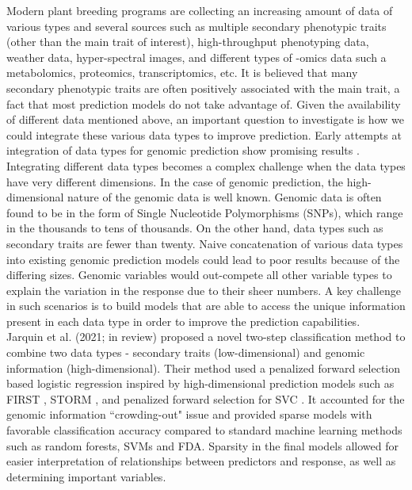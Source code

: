 Modern plant breeding programs are collecting an increasing amount of data of various types and several sources such as multiple secondary phenotypic traits (other than the main trait of interest), high-throughput phenotyping data, weather data, hyper-spectral images, and different types of -omics data such a metabolomics, proteomics, transcriptomics, etc. It is believed that many secondary phenotypic traits are often positively associated with the main trait, a fact that most prediction models do not take advantage of. Given the availability of different data mentioned above, an important question to investigate is how we could integrate these various data types to improve prediction. Early attempts at integration of data types for genomic prediction show promising results \cite{schrag_beyond_2018 , lopez-cruz_regularized_2020, arouisse_improving_2021, sandhu_combining_2021}. \\

Integrating different data types becomes a complex challenge when the data types have very different dimensions. In the case of genomic prediction, the high-dimensional nature of the genomic data is well known. Genomic data is often found to be in the form of Single Nucleotide Polymorphisms (SNPs), which range in the thousands to tens of thousands. On the other hand, data types such as secondary traits are fewer than twenty. Naive concatenation of various data types into existing genomic prediction models could lead to poor results because of the differing sizes. Genomic variables would out-compete all other variable types to explain the variation in the response due to their sheer numbers. A key challenge in such scenarios is to build models that are able to access the unique information present in each data type in order to improve the prediction capabilities. \\

Jarquin et al. (2021; in review) proposed a novel two-step classification method to combine two data types - secondary traits (low-dimensional) and genomic information (high-dimensional). Their method used a penalized forward selection based logistic regression inspired by high-dimensional prediction models such as FIRST \cite{ghosal_first_2009}, STORM \cite{turnbull_iterative_2013}, and penalized forward selection for SVC \cite{ghosal_sparse_2016}. It accounted for the genomic information ``crowding-out" issue and provided sparse models with favorable classification accuracy compared to standard machine learning methods such as random forests, SVMs and FDA. Sparsity in the final models allowed for easier interpretation of relationships between predictors and response, as well as determining important variables. \\

